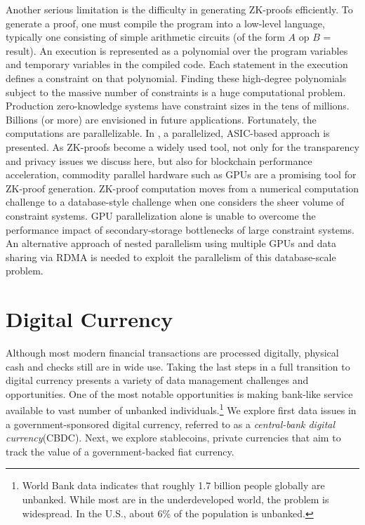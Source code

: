 \documentclass[11pt,dvipdfm]{article}
\begin{document}
Another serious limitation is the difficulty in generating ZK-proofs efficiently.  
To generate a proof, one must compile the program into a low-level language, typically one consisting of
simple arithmetic circuits (of the form $A$ op $B$ = result).
An execution is represented as a polynomial over the program variables and temporary variables in the
compiled code. Each statement in the execution defines a constraint on that polynomial.
Finding these high-degree polynomials subject to the massive number of constraints is a huge computational
problem.  
Production zero-knowledge systems have constraint sizes in the tens of millions. Billions (or more) are envisioned
in future applications.
Fortunately, the computations are parallelizable.  In \cite{PipeZK}, a parallelized, ASIC-based approach is presented.
As ZK-proofs become a widely used tool, not only for the transparency and privacy issues we discuss here,
but also for blockchain performance acceleration, commodity parallel hardware such as GPUs are a
promising tool for ZK-proof generation.
ZK-proof computation moves from a numerical computation challenge to a database-style challenge
when one considers the sheer volume of constraint systems.  GPU parallelization alone is unable to overcome
the performance impact of secondary-storage bottlenecks of large constraint systems.  
An alternative approach of nested parallelism using multiple GPUs and data sharing via RDMA is 
needed to exploit the  parallelism of this database-scale problem\cite{max}.


\section{Digital Currency}

Although most modern financial transactions are processed digitally, physical cash and checks still are in
wide use.  Taking the last steps in a full transition to digital currency presents a variety of data management challenges and
opportunities.  One of the most notable opportunities is making bank-like service available to vast number
of unbanked individuals.\footnote{World Bank\cite{WB} data indicates that roughly 1.7 billion people
globally are unbanked.  While most are in the underdeveloped world, the problem is widespread.
In the U.S., about 6\% of the population is unbanked.}
We explore first data issues in a government-sponsored digital currency, referred to
as a {\em central-bank digital currency}(CBDC).  Next, we explore stablecoins, private currencies that aim to
track the value of a government-backed fiat currency.
\end{document}
